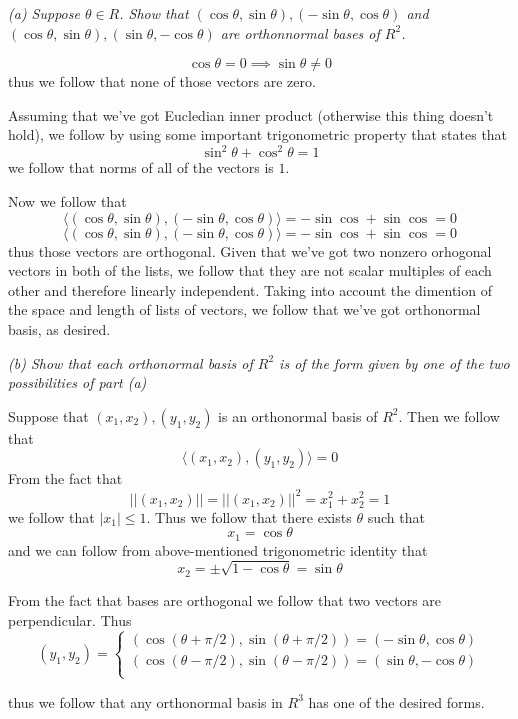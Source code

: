 \documentclass[11pt,oneside,titlepage]{book}
\newcommand{\eangle}[1]{\langle #1 \rangle}
\begin{document}
\textit{(a) Suppose $\theta \in R$. Show that $(\cos \theta, \sin \theta),
  (-\sin \theta, \cos \theta)$ and $(\cos \theta, \sin \theta), (\sin \theta, -\cos \theta)$ are
  orthonnormal bases of $R^2$.}

$$\cos \theta = 0 \implies \sin \theta \neq 0$$
thus we follow that none of those vectors are zero. 

Assuming that we've got Eucledian inner product (otherwise this thing doesn't hold),
we follow  by using  some important trigonometric property that states that
$$\sin^2 \theta + \cos^2 \theta = 1$$
we follow that norms of all of the vectors is $1$.

Now we follow that
$$\eangle{(\cos \theta, \sin \theta),  (-\sin \theta, \cos \theta)} = -\sin \cos + \sin \cos = 0$$
$$\eangle{(\cos \theta, \sin \theta), (-\sin \theta, \cos \theta)} = -\sin \cos + \sin \cos = 0$$
thus those vectors are orthogonal. Given that we've got two nonzero orhogonal vectors in both
of the lists, we follow that they are not scalar multiples of each other and therefore linearly
independent. Taking into account the dimention of the space and length of lists
of vectors, we follow that we've got orthonormal basis, as desired.

\textit{(b) Show that each orthonormal basis of $R^2$ is of the form given by one of the two
  possibilities of part (a)}

Suppose that $(x_1, x_2), (y_1, y_2)$ is an orthonormal basis of $R^2$. Then we follow that
$$\eangle{(x_1, x_2), (y_1, y_2)} = 0$$
From the fact that
$$||(x_1, x_2)|| = ||(x_1, x_2)||^2 = x_1^2 + x_2^2= 1$$
we follow that $|x_1| \leq 1$. Thus we follow that there exists $\theta$ such that
$$x_1 = \cos \theta $$
and we can follow from above-mentioned trigonometric identity that 
$$x_2 = \pm \sqrt{1 - \cos \theta} = \sin \theta $$

From the fact that bases are orthogonal we follow that two vectors are perpendicular. Thus 
$$(y_1, y_2) =
\begin{cases}
  (\cos (\theta + \pi/2), \sin (\theta + \pi/2)) = (-\sin \theta, \cos \theta) \\
  (\cos (\theta - \pi/2), \sin (\theta - \pi/2)) = (\sin \theta, -\cos \theta)\\
\end{cases}
$$

thus we follow that any orthonormal basis in $R^3$ has one of the desired forms.

\subsection{}
\end{document}
